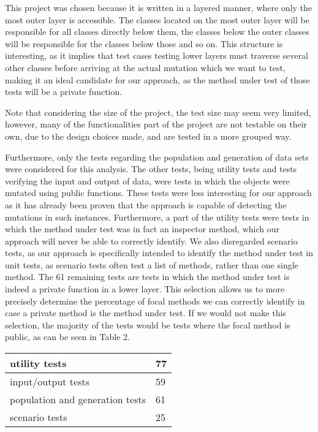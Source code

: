 \documentclass[11pt]{article}
\begin{document}
\begin{multicols}{2}
This project was chosen because it is written in a layered manner, where only the most outer layer is accessible. The classes located on the most outer layer will be responsible for all classes directly below them, the classes below the outer classes will be responsible for the classes below those and so on. This structure is interesting, as it implies that test cases testing lower layers must traverse several other classes before arriving at the actual mutation which we want to test, making it an ideal candidate for our approach, as the method under test of those tests will be a private function.

Note that considering the size of the project, the test size may seem very limited, however, many of the functionalities part of the project are not testable on their own, due to the design choices made, and are tested in a more grouped way. 

Furthermore, only the tests regarding the population and generation of data sets were considered for this analysis. The other tests, being utility tests and tests verifying the input and output of data, were tests in which the objects were mutated using public functions. These tests were less interesting for our approach as it has already been proven that the approach is capable of detecting the mutations in such instances. Furthermore, a part of the utility tests were tests in which the method under test was in fact an inspector method, which our approach will never be able to correctly identify. We also disregarded scenario tests, as our approach is specifically intended to identify the method under test in unit tests, as scenario tests often test a list of methods, rather than one single method. The 61 remaining tests are tests in which the method under test is indeed a private function in a lower layer. This selection allows us to more precisely determine the percentage of focal methods we can correctly identify in case a private method is the method under test. If we would not make this selection, the majority of the tests would be tests where the focal method is public, as can be seen in Table 2.

\begin{center}
	\begin{tabular}{ |p{5.5cm}|p{0.5cm}|  }
		\hline
		utility tests & 77\\
		\hline
		input/output tests & 59\\
		\hline
		population and generation tests & 61\\
		\hline
		scenario tests & 25 \\
		\hline
	\end{tabular}
\end{center}


\end{multicols}
\end{document}
